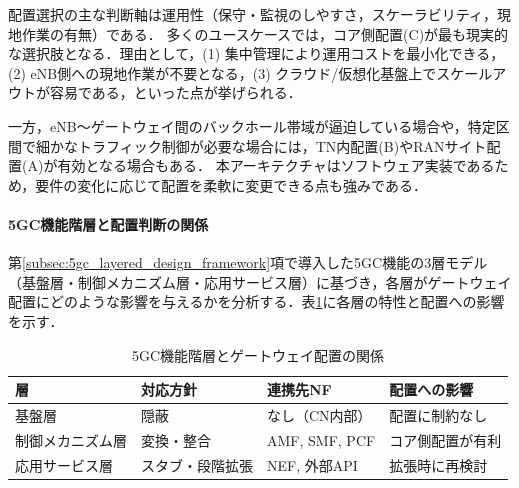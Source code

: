 配置選択の主な判断軸は運用性（保守・監視のしやすさ，スケーラビリティ，現地作業の有無）である．
多くのユースケースでは，コア側配置(C)が最も現実的な選択肢となる．理由として，(1) 集中管理により運用コストを最小化できる，(2) eNB側への現地作業が不要となる，(3) クラウド/仮想化基盤上でスケールアウトが容易である，といった点が挙げられる．

一方，eNB〜ゲートウェイ間のバックホール帯域が逼迫している場合や，特定区間で細かなトラフィック制御が必要な場合には，TN内配置(B)やRANサイト配置(A)が有効となる場合もある．
本アーキテクチャはソフトウェア実装であるため，要件の変化に応じて配置を柔軟に変更できる点も強みである．

\paragraph{5GC機能階層と配置判断の関係}
第\ref{subsec:5gc_layered_design_framework}項で導入した5GC機能の3層モデル（基盤層・制御メカニズム層・応用サービス層）に基づき，各層がゲートウェイ配置にどのような影響を与えるかを分析する．表\ref{tab:layer_deployment}に各層の特性と配置への影響を示す．

\begin{table}[htbp]
\centering
\caption{5GC機能階層とゲートウェイ配置の関係}
\label{tab:layer_deployment}
\begin{tabular}{|p{2.5cm}|p{3cm}|p{3cm}|p{4.5cm}|}
\hline
\textbf{層} & \textbf{対応方針} & \textbf{連携先NF} & \textbf{配置への影響} \\
\hline
基盤層 & 隠蔽 & なし（CN内部） & 配置に制約なし \\
\hline
制御メカニズム層 & 変換・整合 & AMF, SMF, PCF & コア側配置が有利 \\
\hline
応用サービス層 & スタブ・段階拡張 & NEF, 外部API & 拡張時に再検討 \\
\hline
\end{tabular}
\end{table}

